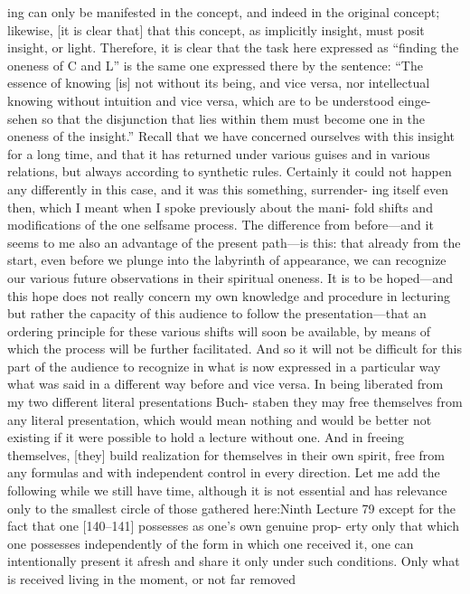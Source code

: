 ing can only be manifested in the concept, and indeed in the original concept;
likewise, [it is clear that] that this concept, as implicitly insight, must posit
insight, or light. Therefore, it is clear that the task here expressed as “finding
the oneness of C and L” is the same one expressed there by the sentence: “The
essence of knowing [is] not without its being, and vice versa, nor intellectual
knowing without intuition and vice versa, which are to be understood {einge-
sehen} so that the disjunction that lies within them must become one in the
oneness of the insight.” Recall that we have concerned ourselves with this
insight for a long time, and that it has returned under various guises and in
various relations, but always according to synthetic rules. Certainly it could
not happen any differently in this case, and it was this something, surrender-
ing itself even then, which I meant when I spoke previously about the mani-
fold shifts and modifications of the one selfsame process. The difference from
before—and it seems to me also an advantage of the present path—is this: that
already from the start, even before we plunge into the labyrinth of appearance,
we can recognize our various future observations in their spiritual oneness. It
is to be hoped—and this hope does not really concern my own knowledge and
procedure in lecturing but rather the capacity of this audience to follow the
presentation—that an ordering principle for these various shifts will soon be
available, by means of which the process will be further facilitated. And so it
will not be difficult for this part of the audience to recognize in what is now
expressed in a particular way what was said in a different way before and vice
versa. In being liberated from my two different literal presentations {Buch-
staben} they may free themselves from any literal presentation, which would
mean nothing and would be better not existing if it were possible to hold a
lecture without one. And in freeing themselves, [they] build realization for
themselves in their own spirit, free from any formulas and with independent
control in every direction.
Let me add the following while we still have time, although it is not
essential and has relevance only to the smallest circle of those gathered here:Ninth Lecture
79
except for the fact that one [140–141] possesses as one’s own genuine prop-
erty only that which one possesses independently of the form in which one
received it, one can intentionally present it afresh and share it only under such
conditions. Only what is received living in the moment, or not far removed
